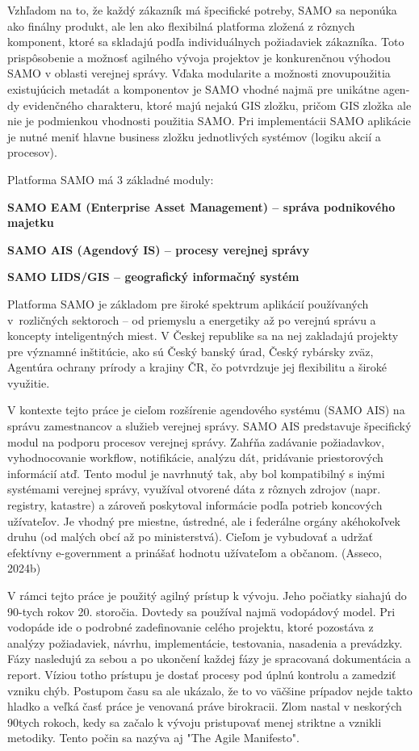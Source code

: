 Vzhľadom na to, že každý zákazník má špecifické potreby, SAMO sa neponúka ako finálny produkt, ale len ako flexibilná platforma zložená z rôznych komponent, ktoré sa skladajú podľa individuálnych požiadaviek zákazníka. Toto prispôsobenie a možnosť agilného vývoja projektov je konkurenčnou výhodou SAMO v oblasti verejnej správy. Vďaka modularite a možnosti znovupoužitia existujúcich metadát a komponentov je SAMO vhodné najmä pre unikátne agen-dy evidenčného charakteru, ktoré majú nejakú GIS zložku, pričom GIS zložka ale nie je podmienkou vhodnosti použitia SAMO. Pri implementácii SAMO aplikácie je nutné meniť hlavne business zložku jednotlivých systémov (logiku akcií a procesov).

Platforma SAMO má 3 základné moduly:

\startitemize
\item \start\bf SAMO EAM \stop (Enterprise Asset Management) --  správa podnikového majetku
\item \start\bf SAMO AIS \stop (Agendový IS) -- procesy verejnej správy
\item  \start\bf SAMO LIDS/GIS \stop -- geografický informačný systém
\stopitemize

Platforma SAMO je základom pre široké spektrum aplikácií používaných v~rozličných sektoroch – od priemyslu a energetiky až po verejnú správu a koncepty inteligentných miest. V Českej republike sa na nej zakladajú projekty pre významné inštitúcie, ako sú Český banský úrad, Český rybársky zväz, Agentúra ochrany prírody a krajiny ČR, čo potvrdzuje jej flexibilitu a široké využitie.


V kontexte tejto práce je cieľom rozšírenie agendového systému (SAMO AIS) na správu zamestnancov a služieb verejnej správy. SAMO AIS predstavuje špecifický modul na podporu procesov verejnej správy. Zahŕňa zadávanie požiadavkov, vyhodnocovanie workflow, notifikácie, analýzu dát, pridávanie priestorových informácií atď. Tento modul je navrhnutý tak, aby bol kompatibilný s inými systémami verejnej správy, využíval otvorené dáta z rôznych zdrojov (napr. registry, katastre) a zároveň poskytoval informácie podľa potrieb koncových užívateľov. Je vhodný pre miestne, ústredné, ale i federálne orgány akéhokoľvek druhu (od malých obcí až po ministerstvá). Cieľom je vybudovať a udržať efektívny e-government a prinášať hodnotu užívateľom a občanom. \scr(Asseco, 2024b)





V rámci tejto práce je použitý agilný prístup k vývoju. Jeho počiatky siahajú do 90-tych rokov 20. storočia. Dovtedy sa používal najmä vodopádový model. Pri vodopáde ide o podrobné zadefinovanie celého projektu, ktoré pozostáva z analýzy požiadaviek, návrhu, implementácie, testovania, nasadenia a prevádzky. Fázy nasledujú za sebou a po ukončení každej fázy je spracovaná dokumentácia a report. Víziou totho prístupu je dostať procesy pod úplnú kontrolu a zamedziť vzniku chýb. Postupom času sa ale ukázalo, že to vo väčšine prípadov nejde takto hladko a veľká časť práce je venovaná práve birokracii. Zlom nastal v neskorých 90tych rokoch, kedy sa začalo k vývoju pristupovať menej striktne a vznikli metodiky. Tento počin sa nazýva aj "The Agile Manifesto".

